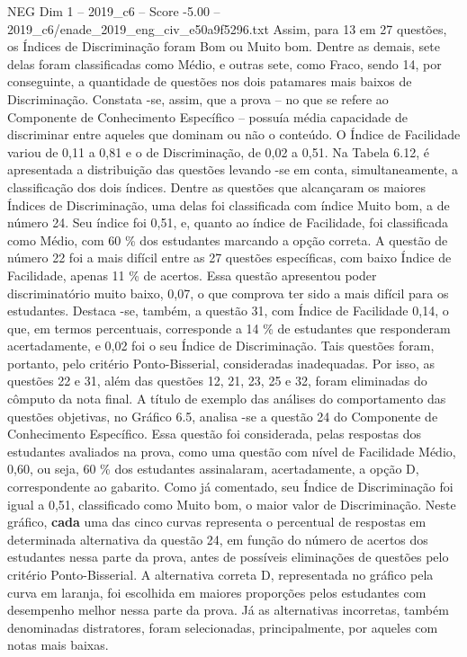 \begin{textsample}{NEG Dim 1 – 2019\_c6 – Score -5.00 – 2019\_c6/enade\_2019\_eng\_civ\_e50a9f5296.txt}
Assim, para 13 em 27 questões, os Índices de Discriminação foram Bom ou Muito bom.
Dentre as demais, sete delas foram classificadas como Médio, e outras sete, como Fraco, sendo 14, por conseguinte, a quantidade de questões nos dois patamares mais baixos de Discriminação.
Constata -se, assim, que a prova – no que se refere ao Componente de Conhecimento Específico – possuía média capacidade de discriminar entre aqueles que dominam ou não o conteúdo.
O Índice de Facilidade variou de 0,11 a 0,81 e o de Discriminação, de 0,02 a 0,51.
Na Tabela 6.12, é apresentada a distribuição das questões levando -se em conta, simultaneamente, a classificação dos dois índices.
Dentre as questões que alcançaram os maiores Índices de Discriminação, uma delas foi classificada com índice Muito bom, a de número 24.
Seu índice foi 0,51, e, quanto ao índice de Facilidade, foi classificada como Médio, com 60 \% dos estudantes marcando a opção correta.
A questão de número 22 foi a mais difícil entre as 27 questões específicas, com baixo Índice de Facilidade, apenas 11 \% de acertos.
Essa questão apresentou poder discriminatório muito baixo, 0,07, o que comprova ter sido a mais difícil para os estudantes.
Destaca -se, também, a questão 31, com Índice de Facilidade 0,14, o que, em termos percentuais, corresponde a 14 \% de estudantes que responderam acertadamente, e 0,02 foi o seu Índice de Discriminação.
Tais questões foram, portanto, pelo critério Ponto-Bisserial, consideradas inadequadas.
Por isso, as questões 22 e 31, além das questões 12, 21, 23, 25 e 32, foram eliminadas do cômputo da nota final.
A título de exemplo das análises do comportamento das questões objetivas, no Gráfico 6.5, analisa -se a questão 24 do Componente de Conhecimento Específico.
Essa questão foi considerada, pelas respostas dos estudantes avaliados na prova, como uma questão com nível de Facilidade Médio, 0,60, ou seja, 60 \% dos estudantes assinalaram, acertadamente, a opção D, correspondente ao gabarito.
Como já comentado, seu Índice de Discriminação foi igual a 0,51, classificado como Muito bom, o maior valor de Discriminação.
Neste gráfico, \textbf{cada} uma das cinco curvas representa o percentual de respostas em determinada alternativa da questão 24, em função do número de acertos dos estudantes nessa parte da prova, antes de possíveis eliminações de questões pelo critério Ponto-Bisserial.
A alternativa correta D, representada no gráfico pela curva em laranja, foi escolhida em maiores proporções pelos estudantes com desempenho melhor nessa parte da prova.
Já as alternativas incorretas, também denominadas distratores, foram selecionadas, principalmente, por aqueles com notas mais baixas.

\end{textsample}
